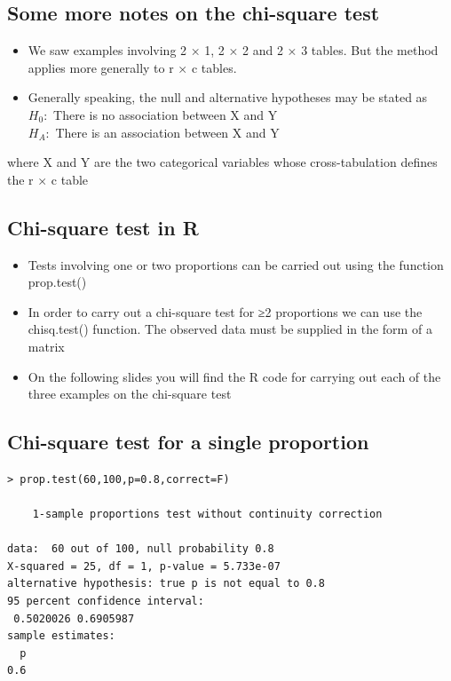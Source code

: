 \documentclass[
]{book}
\providecommand{\tightlist}{%
  \setlength{\itemsep}{0pt}\setlength{\parskip}{0pt}}
\begin{document}
\hypertarget{some-more-notes-on-the-chi-square-test}{%
\subsection{Some more notes on the chi-square test}\label{some-more-notes-on-the-chi-square-test}}

\begin{itemize}
\tightlist
\item
  We saw examples involving 2 × 1, 2 × 2 and 2 × 3 tables. But the method applies more generally to r × c tables.
\item
  Generally speaking, the null and alternative hypotheses may be stated as\\
  \(H_0:\) There is no association between X and Y\\
  \(H_A:\) There is an association between X and Y
\end{itemize}

where X and Y are the two categorical variables whose cross-tabulation defines the r × c table

\hypertarget{chi-square-test-in-r}{%
\subsection{Chi-square test in R}\label{chi-square-test-in-r}}

\begin{itemize}
\tightlist
\item
  Tests involving one or two proportions can be carried out using the function prop.test()
\item
  In order to carry out a chi-square test for ≥2 proportions we can use the chisq.test() function. The observed data must be supplied in the form of a matrix
\item
  On the following slides you will find the R code for carrying out each of the three examples on the chi-square test
\end{itemize}

\hypertarget{chi-square-test-for-a-single-proportion}{%
\subsection{Chi-square test for a single proportion}\label{chi-square-test-for-a-single-proportion}}

\begin{verbatim}
> prop.test(60,100,p=0.8,correct=F)

    1-sample proportions test without continuity correction

data:  60 out of 100, null probability 0.8
X-squared = 25, df = 1, p-value = 5.733e-07
alternative hypothesis: true p is not equal to 0.8
95 percent confidence interval:
 0.5020026 0.6905987
sample estimates:
  p 
0.6 
\end{verbatim}
\end{document}
